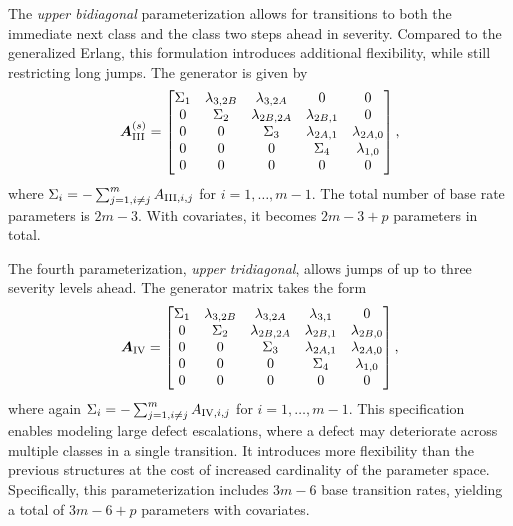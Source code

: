 The \textit{upper bidiagonal} parameterization allows for transitions to both the immediate next class and the class two steps ahead in severity. Compared to the generalized Erlang, this formulation introduces additional flexibility, while still restricting long jumps. The generator is given by
\begin{align}
\bm{A}_{\RN{3}}^{(s)} = \begin{bmatrix}
\Sigma_1 & \lambda_{3,2B} & \lambda_{3,2A} & 0 & 0 \\
0 & \Sigma_2 & \lambda_{2B,2A} & \lambda_{2B,1} & 0 \\
0 & 0 & \Sigma_3 & \lambda_{2A,1} & \lambda_{2A,0} \\
0 & 0 & 0 & \Sigma_4 & \lambda_{1,0} \\
0 & 0 & 0 & 0 & 0 \\
\end{bmatrix}, \label{eq:generator_bidiagonal}
\end{align}
where $\Sigma_i = -\sum_{j=1, i \neq j}^m A_{\RN{3},i,j}$ for $i = 1, \dots, m-1$.
The total number of base rate parameters is $2m - 3$. With covariates, it becomes $2m - 3 + p$ parameters in total.

The fourth parameterization, \textit{upper tridiagonal}, allows jumps of up to three severity levels ahead. The generator matrix takes the form
\begin{align}
\bm{A}_{\RN{4}}= \begin{bmatrix}
\Sigma_1 & \lambda_{3,2B} & \lambda_{3,2A} & \lambda_{3,1} & 0 \\
0 & \Sigma_2 & \lambda_{2B,2A} & \lambda_{2B,1} & \lambda_{2B,0} \\
0 & 0 & \Sigma_3 & \lambda_{2A,1} & \lambda_{2A,0} \\
0 & 0 & 0 & \Sigma_4 & \lambda_{1,0} \\
0 & 0 & 0 & 0 & 0 \\
\end{bmatrix}, \label{eq:generator_tridiagonal}
\end{align}
where again $\Sigma_i = -\sum_{j=1, i \neq j}^m A_{\RN{4},i,j}$ for $i = 1, \dots, m-1$.
This specification enables modeling large defect escalations, where a defect may deteriorate across multiple classes in a single transition. It introduces more flexibility than the previous structures at the cost of increased cardinality of the parameter space. Specifically, this parameterization includes $3m - 6$ base transition rates, yielding a total of $3m - 6 + p$ parameters with covariates.


